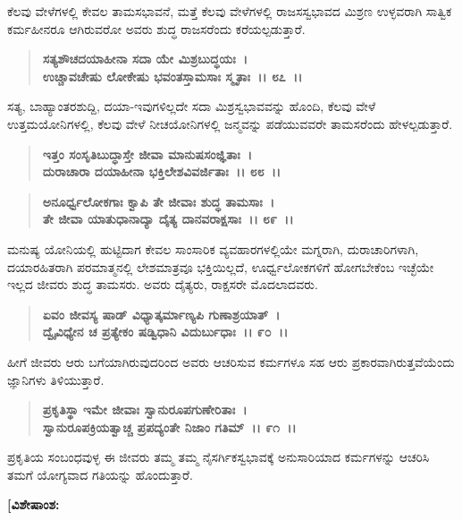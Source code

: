 ಕೆಲವು ವೇಳೆಗಳಲ್ಲಿ ಕೇವಲ ತಾಮಸಭಾವನೆ, ಮತ್ತೆ ಕೆಲವು ವೇಳೆಗಳಲ್ಲಿ ರಾಜಸಸ್ವಭಾವದ ಮಿಶ್ರಣ ಉಳ್ಳವರಾಗಿ ಸಾತ್ವಿಕ ಕರ್ಮಹೀನರೂ ಆಗಿರುವರೋ ಅವರು ಶುದ್ಧ ರಾಜಸರೆಂದು ಕರೆಯಲ್ಪಡುತ್ತಾರೆ.

\begin{verse}
\textbf{ಸತ್ಯಶೌಚದಯಾಹೀನಾ ಸದಾ ಯೇ ಮಿಶ್ರಬುದ್ಧಯಃ~।}\\\textbf{ಉಚ್ಚಾವಚೇಷು ಲೋಕೇಷು ಭವಂತಸ್ತಾಮಸಾಃ ಸ್ಮೃತಾಃ~।। ೮೭~।।}
\end{verse}

ಸತ್ಯ, ಬಾಹ್ಯಾಂತರಶುದ್ದಿ, ದಯಾ-ಇವುಗಳಿಲ್ಲದೇ ಸದಾ ಮಿಶ್ರಸ್ವಭಾವವನ್ನು ಹೊಂದಿ, ಕೆಲವು ವೇಳೆ ಉತ್ತಮಯೋನಿಗಳಲ್ಲಿ, ಕೆಲವು ವೇಳೆ ನೀಚಯೋನಿಗಳಲ್ಲಿ ಜನ್ಮವನ್ನು ಪಡೆಯುವವರೇ ತಾಮಸರೆಂದು ಹೇಳಲ್ಪಡುತ್ತಾರೆ.

\begin{verse}
\textbf{ಇತ್ತಂ ಸಂಸೃತಿಬುದ್ಧಾಸ್ತೇ ಜೀವಾ ಮಾನುಷಸಂಜ್ಞಿತಾಃ~।}\\\textbf{ದುರಾಚಾರಾ ದಯಾಹೀನಾ ಭಕ್ತಿಲೇಶವಿವರ್ಜಿತಾಃ~।। ೮೮~।।} 
\end{verse}

\begin{verse}
\textbf{ಅನೂರ್ಧ್ವಲೋಕಗಾಃ ಕ್ವಾಪಿ ತೇ ಜೀವಾಃ ಶುದ್ಧ ತಾಮಸಾಃ~।}\\\textbf{ತೇ ಜೀವಾ ಯಾತುಧಾನಾದ್ಯಾ ದೈತ್ಯ ದಾನವರಾಕ್ಷಸಾಃ~।। ೮೯~।।}
\end{verse}

ಮನುಷ್ಯ ಯೋನಿಯಲ್ಲಿ ಹುಟ್ಟಿದಾಗ ಕೇವಲ ಸಾಂಸಾರಿಕ ವ್ಯವಹಾರಗಳಲ್ಲಿಯೇ ಮಗ್ನರಾಗಿ, ದುರಾಚಾರಿಗಳಾಗಿ, ದಯಾರಹಿತರಾಗಿ ಪರಮಾತ್ಮನಲ್ಲಿ ಲೇಶಮಾತ್ರವೂ ಭಕ್ತಿಯಿಲ್ಲದೆ, ಊರ್ಧ್ವಲೋಕಗಳಿಗೆ ಹೋಗಬೇಕೆಂಬ ಇಚ್ಛೆಯೇ ಇಲ್ಲದ ಜೀವರು ಶುದ್ಧ ತಾಮಸರು. ಅವರು ದೈತ್ಯರು, ರಾಕ್ಷಸರೇ ಮೊದಲಾದವರು.

\begin{verse}
\textbf{ಏವಂ ಜೀವಸ್ಯ ಷಾಡ್ ವಿಧ್ಯಾತ್ಕರ್ಮಾಣ್ಯಪಿ ಗುಣಾಶ್ರಯಾತ್~।}\\\textbf{ದ್ವೈವಿಧ್ಯೇನ ಚ ಪ್ರತ್ಯೇಕಂ ಷಡ್ವಿಧಾನಿ ವಿದುರ್ಬುಧಾಃ~।। ೯೦~।।}
\end{verse}

ಹೀಗೆ ಜೀವರು ಆರು ಬಗೆಯಾಗಿರುವುದರಿಂದ ಅವರು ಆಚರಿಸುವ ಕರ್ಮಗಳೂ ಸಹ ಆರು ಪ್ರಕಾರವಾಗಿರುತ್ತವೆಯೆಂದು ಜ್ಞಾನಿಗಳು ತಿಳಿಯುತ್ತಾರೆ.

\begin{verse}
\textbf{ಪ್ರಕೃತಿಸ್ಥಾ ಇಮೇ ಜೀವಾಃ ಸ್ವಾನುರೂಪಗುಣೇರಿತಾಃ~।}\\\textbf{ಸ್ವಾನುರೂಪಕ್ರಿಯತ್ವಾಚ್ಚ ಪ್ರಪದ್ಯಂತೇ ನಿಜಾಂ ಗತಿಮ್~।। ೯೧~।।}
\end{verse}

ಪ್ರಕೃತಿಯ ಸಂಬಂಧವುಳ್ಳ ಈ ಜೀವರು ತಮ್ಮ ತಮ್ಮ ನೈಸರ್ಗಿಕಸ್ವಭಾವಕ್ಕೆ ಅನುಸಾರಿಯಾದ ಕರ್ಮಗಳನ್ನು ಆಚರಿಸಿ ತಮಗೆ ಯೋಗ್ಯವಾದ ಗತಿಯನ್ನು ಹೊಂದುತ್ತಾರೆ.

\begin{flushleft}
\textbf{[ವಿಶೇಷಾಂಶ:} 
\end{flushleft}

